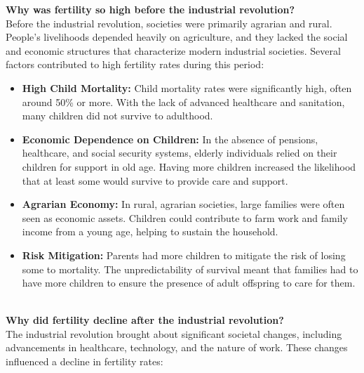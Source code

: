 \documentclass[../summary.tex]{subfiles}
\begin{document}
\textbf{Why was fertility so high before the industrial revolution?}\\
Before the industrial revolution, societies were primarily agrarian and rural. People's livelihoods depended heavily on agriculture, and they lacked the social and economic structures that characterize modern industrial societies. Several factors contributed to high fertility rates during this period:
\begin{itemize}
	\item \textbf{High Child Mortality:} Child mortality rates were significantly high, often around 50\% or more. With the lack of advanced healthcare and sanitation, many children did not survive to adulthood.
	\item \textbf{Economic Dependence on Children:} In the absence of pensions, healthcare, and social security systems, elderly individuals relied on their children for support in old age. Having more children increased the likelihood that at least some would survive to provide care and support.
	\item \textbf{Agrarian Economy:} In rural, agrarian societies, large families were often seen as economic assets. Children could contribute to farm work and family income from a young age, helping to sustain the household.
	\item \textbf{Risk Mitigation:} Parents had more children to mitigate the risk of losing some to mortality. The unpredictability of survival meant that families had to have more children to ensure the presence of adult offspring to care for them.
\end{itemize}
\ \\
\textbf{Why did fertility decline after the industrial revolution?}\\
The industrial revolution brought about significant societal changes, including advancements in healthcare, technology, and the nature of work. These changes influenced a decline in fertility rates:
\end{document}
